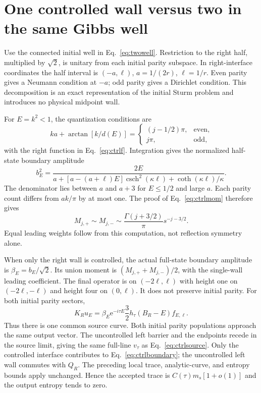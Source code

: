 \documentclass[aps,pra,reprint,superscriptaddress,longbibliography]{revtex4-2}
\newcommand{\ee}{\mathrm e}
\begin{document}
\section{One controlled wall versus two in the same Gibbs well}
\label{app:switch}

Use the connected initial well in Eq.~\eqref{eq:twowell}.
Restriction to the right half, multiplied by $\sqrt2$, is unitary
from each initial parity subspace. In right-interface coordinates
the half interval is $(-a,\ell)$, $a=1/(2r)$,
$\ell=1/r$. Even parity gives a Neumann condition at $-a$;
odd parity gives a Dirichlet condition. This decomposition is an
exact representation of the initial Sturm problem and introduces
no physical midpoint wall.

For $E=k^2<1$, the quantization conditions are
\begin{equation}
 ka+\arctan[k/d(E)]=
 \begin{cases}(j-1/2)\pi,&\text{even},\\j\pi,&\text{odd},\end{cases}
                                                        \label{eq:switchphase}
\end{equation}
with the right function in Eq.~\eqref{eq:ctrlf}. Integration
gives the normalized half-state boundary amplitude
\begin{equation}
 b_E^2=\frac{2E}
 {a+[a-(a+\ell)E]\operatorname{csch}^2(\kappa\ell)
                      +\coth(\kappa\ell)/\kappa}.       \label{eq:switchamp}
\end{equation}
The denominator lies between $a$ and $a+3$ for $E\le1/2$ and
large $a$. Each parity count differs from $ak/\pi$ by at most
one. The proof of Eq.~\eqref{eq:ctrlmom} therefore gives
\begin{equation}
 M_{j,+}\sim M_{j,-}\sim
       \frac{\Gamma(j+3/2)}\pi s^{-j-3/2}.               \label{eq:switchmom}
\end{equation}
Equal leading weights follow from this computation, not reflection
symmetry alone.

When only the right wall is controlled, the actual full-state
boundary amplitude is $\beta_E=b_E/\sqrt2$. Its union moment is
$(M_{j,+}+M_{j,-})/2$, with the single-wall leading coefficient.
The final operator is on $(-2\ell,\ell)$ with height one on
$(-2\ell,-\ell)$ and height four on $(0,\ell)$. It does not
preserve initial parity. For both initial parity sectors,
\begin{equation}
 K_Ru_E=\beta_E\ee^{-i\tau E}\frac32
                 h_\tau(B_R-E)f_{E,\ell}.               \label{eq:switchcolumn}
\end{equation}
Thus there is one common source curve. Both initial parity
populations approach the same output vector. The uncontrolled
left barrier and the endpoints recede in the source limit, giving
the same full-line $v_\tau$ as Eq.~\eqref{eq:ctrlsource}.
Only the controlled interface contributes to
Eq.~\eqref{eq:ctrlboundary}; the uncontrolled left wall commutes
with $Q_R$. The preceding local trace, analytic-curve, and entropy
bounds apply unchanged. Hence the accepted trace is
$C(\tau)m_s[1+o(1)]$ and the output entropy tends to zero.
\end{document}
